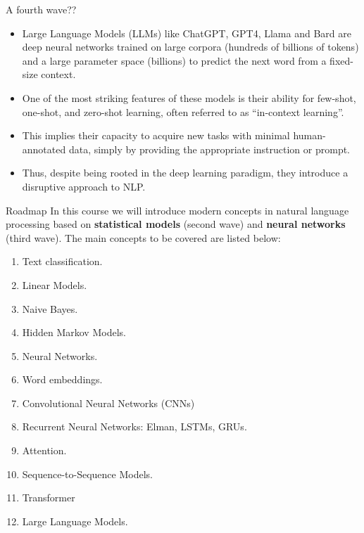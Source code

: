 \documentclass[handout]{beamer}
\begin{document}
\begin{frame}{A fourth wave??}
\begin{scriptsize}

\begin{itemize}
\item Large Language Models (LLMs) like ChatGPT, GPT4, Llama and Bard are deep neural networks trained on large corpora (hundreds of billions of tokens) and a large parameter space (billions) to predict the next word from a fixed-size context.
\item One of the most striking features of these models is their ability for few-shot, one-shot, and zero-shot learning, often referred to as ``in-context learning''.
\item This implies their capacity to acquire new tasks with minimal human-annotated data, simply by providing the appropriate instruction or prompt.
\item Thus, despite being rooted in the deep learning paradigm, they introduce a disruptive approach to NLP.
\end{itemize}
\end{scriptsize}
\end{frame}


\begin{frame}{Roadmap}
In this course we will introduce modern concepts in natural language processing based on \textbf{statistical models} (second wave) and \textbf{neural networks} (third wave). The main concepts to be covered are listed below:
\begin{scriptsize}
\begin{enumerate}
\item Text classification.
\item Linear Models.
\item Naive Bayes.
\item Hidden Markov Models.
\item Neural Networks.
\item Word embeddings.
\item Convolutional Neural Networks (CNNs) 
\item Recurrent Neural Networks: Elman, LSTMs, GRUs. 
\item Attention.
\item Sequence-to-Sequence Models.
\item Transformer
\item Large Language Models.
\end{enumerate} 
\end{scriptsize}
\end{frame}
\end{document}
